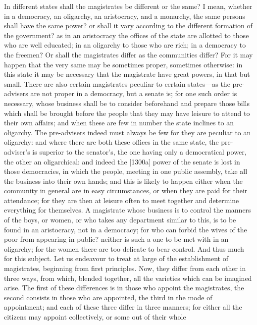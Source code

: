 In different states shall the magistrates be different or the same? I
mean, whether in a democracy, an oligarchy, an aristocracy, and a
monarchy, the same persons shall have the same power? or shall it vary
according to the different formation of the government? as in an
aristocracy the offices of the state are allotted to those who are well
educated; in an oligarchy to those who are rich; in a democracy to the
freemen? Or shall the magistrates differ as the communities differ? For it
may happen that the very same may be sometimes proper, sometimes
otherwise: in this state it may be necessary that the magistrate have
great powers, in that but small. There are also certain magistrates
peculiar to certain states—as the pre-advisers are not proper in a
democracy, but a senate is; for one such order is necessary, whose
business shall be to consider beforehand and prepare those bills which
shall be brought before the people that they may have leisure to attend to
their own affairs; and when these are few in number the state inclines to
an oligarchy. The pre-advisers indeed must always be few for they are
peculiar to an oligarchy: and where there are both these offices in the
same state, the pre-adviser's is superior to the senator's, the one having
only a democratical power, the other an oligarchical: and indeed the
[1300a] power of the senate is lost in those democracies, in which the
people, meeting in one public assembly, take all the business into their
own hands; and this is likely to happen either when the community in
general are in easy circumstances, or when they are paid for their
attendance; for they are then at leisure often to meet together and
determine everything for themselves. A magistrate whose business is to
control the manners of the boys, or women, or who takes any department
similar to this, is to be found in an aristocracy, not in a democracy; for
who can forbid the wives of the poor from appearing in public? neither is
such a one to be met with in an oligarchy; for the women there are too
delicate to bear control. And thus much for this subject. Let us endeavour
to treat at large of the establishment of magistrates, beginning from
first principles. Now, they differ from each other in three ways, from
which, blended together, all the varieties which can be imagined arise.
The first of these differences is in those who appoint the magistrates,
the second consists in those who are appointed, the third in the mode of
appointment; and each of these three differ in three manners; for either
all the citizens may appoint collectively, or some out of their whole
